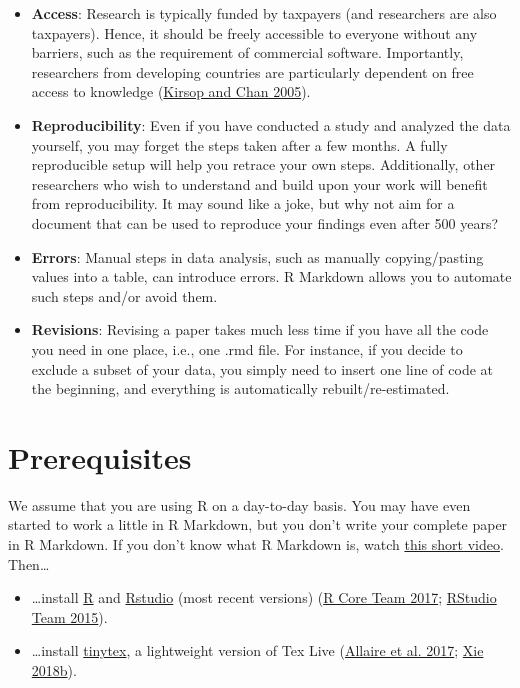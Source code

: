 \documentclass[
  12pt,
]{article}
\providecommand{\tightlist}{%
  \setlength{\itemsep}{0pt}\setlength{\parskip}{0pt}}
\begin{document}
\begin{itemize}
\tightlist
\item
  \textbf{Access}: Research is typically funded by taxpayers (and researchers are also taxpayers). Hence, it should be freely accessible to everyone without any barriers, such as the requirement of commercial software. Importantly, researchers from developing countries are particularly dependent on free access to knowledge (\protect\hyperlink{ref-Kirsop2005-ro}{Kirsop and Chan 2005}).
\item
  \textbf{Reproducibility}: Even if you have conducted a study and analyzed the data yourself, you may forget the steps taken after a few months. A fully reproducible setup will help you retrace your own steps. Additionally, other researchers who wish to understand and build upon your work will benefit from reproducibility. It may sound like a joke, but why not aim for a document that can be used to reproduce your findings even after 500 years?
\item
  \textbf{Errors}: Manual steps in data analysis, such as manually copying/pasting values into a table, can introduce errors. R Markdown allows you to automate such steps and/or avoid them.
\item
  \textbf{Revisions}: Revising a paper takes much less time if you have all the code you need in one place, i.e., one .rmd file. For instance, if you decide to exclude a subset of your data, you simply need to insert one line of code at the beginning, and everything is automatically rebuilt/re-estimated.
\end{itemize}

\hypertarget{prerequisites}{%
\section{Prerequisites}\label{prerequisites}}

We assume that you are using R on a day-to-day basis. You may have even started to work a little in R Markdown, but you don't write your complete paper in R Markdown. If you don't know what R Markdown is, watch \href{https://vimeo.com/178485416}{this short video}. Then\ldots{}

\begin{itemize}
\tightlist
\item
  \ldots install \href{https://www.r-project.org/}{R} and \href{https://www.rstudio.com/}{Rstudio} (most recent versions) (\protect\hyperlink{ref-R2017}{R Core Team 2017}; \protect\hyperlink{ref-Rstudio2015}{RStudio Team 2015}).
\item
  \ldots install \href{https://yihui.name/tinytex/}{tinytex}, a lightweight version of Tex Live (\protect\hyperlink{ref-markdown2017}{Allaire et al. 2017}; \protect\hyperlink{ref-tinytex}{Xie 2018b}).
\end{itemize}
\end{document}
